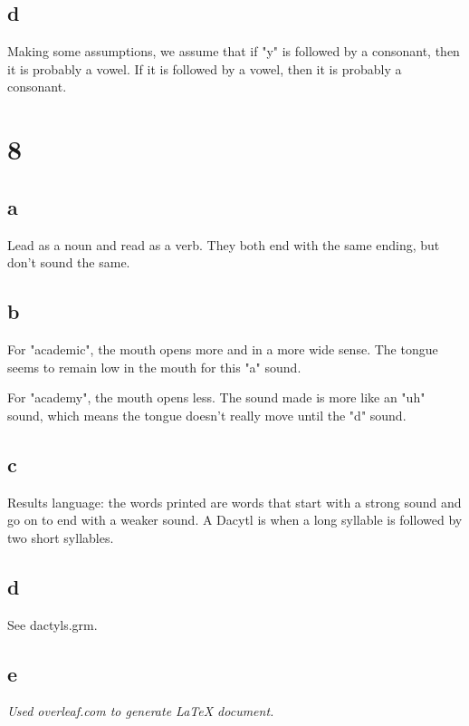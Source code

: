 \documentclass[12pt, letterpaper]{article}
\begin{document}
\subsection{d}
Making some assumptions, we assume that if "y" is followed by a consonant, then it is probably a vowel. If it is followed by a vowel, then it is probably a consonant. 

\section{8}
\subsection{a}
Lead as a noun and read as a verb. They both end with the same ending, but don't sound the same. 

\subsection{b}
For "academic", the mouth opens more and in a more wide sense. The tongue seems to remain low in the mouth for this "a" sound.

For "academy", the mouth opens less. The sound made is more like an "uh" sound, which means the tongue doesn't really move until the "d" sound. 

\subsection{c}
Results language: the words printed are words that start with a strong sound and go on to end with a weaker sound. A Dacytl is when a long syllable is followed by two short syllables. 

\subsection{d}
See dactyls.grm.

\subsection{e}



\begin{center}
\textit{Used overleaf.com to generate LaTeX document.}
\end{center}
\end{document}
